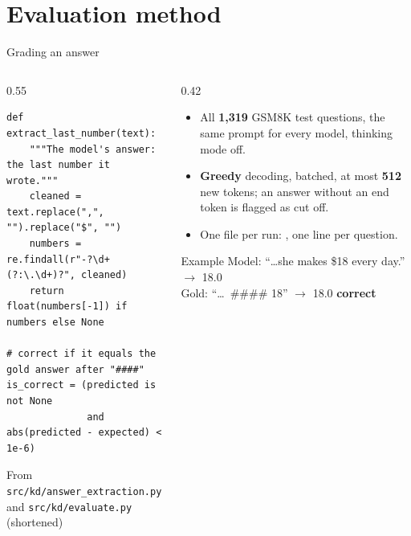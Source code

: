 \renewcommand{\sectioninfo}{Presenters: E2 (2 min), E1 (2 min)}
\section{Evaluation method}

\begin{frame}[fragile]{Grading an answer\hfill{}}
  \begin{columns}[T]
    \begin{column}{0.55\textwidth}
\begin{lstlisting}
def extract_last_number(text):
    """The model's answer: the last number it wrote."""
    cleaned = text.replace(",", "").replace("$", "")
    numbers = re.findall(r"-?\d+(?:\.\d+)?", cleaned)
    return float(numbers[-1]) if numbers else None

# correct if it equals the gold answer after "####"
is_correct = (predicted is not None
              and abs(predicted - expected) < 1e-6)
\end{lstlisting}
      {\tiny\color{kdgray} From \texttt{src/kd/answer\_extraction.py} and \texttt{src/kd/evaluate.py} (shortened)}
    \end{column}
    \begin{column}{0.42\textwidth}
      \footnotesize
      \begin{itemize}
        \item All \textbf{1,319} GSM8K test questions, the same prompt for
              every model, thinking mode off.
        \item \textbf{Greedy} decoding, batched, at most \textbf{512} new
              tokens; an answer without an end token is flagged as cut off.
        \item One file per run: , one line per
              question.
      \end{itemize}
      \begin{block}{Example}
        \scriptsize
        Model: ``\dots she makes \$18 every day.'' $\rightarrow$ 18.0\\
        Gold: ``\dots\ \#\#\#\# 18'' $\rightarrow$ 18.0 \quad \textcolor{kdteal}{\textbf{correct}}
      \end{block}
    \end{column}
  \end{columns}
\end{frame}

